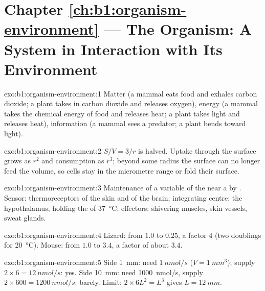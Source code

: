 \section*{Chapter \ref{ch:b1:organism-environment} --- The Organism: A System in Interaction with Its Environment}

\begin{solution}{exo:b1:organism-environment:1}
Matter (a mammal eats food and exhales carbon dioxide; a plant takes in
carbon dioxide and releases oxygen), energy (a mammal takes the chemical
energy of food and releases heat; a plant takes light and releases heat),
information (a mammal sees a predator; a plant bends toward light).
\end{solution}

\begin{solution}{exo:b1:organism-environment:2}
$S/V = 3/r$ is halved. Uptake through the surface grows as $r^2$ and
consumption as $r^3$; beyond some radius the surface can no longer feed
the volume, so cells stay in the micrometre range or fold their surface.
\end{solution}

\begin{solution}{exo:b1:organism-environment:3}
Maintenance of a variable of the  near a 
by . Sensor: thermoreceptors of the skin and of the
brain; integrating centre: the hypothalamus, holding the  of
\qty{37}{\celsius}; effectors: shivering muscles, skin vessels, sweat
glands.
\end{solution}

\begin{solution}{exo:b1:organism-environment:4}
Lizard: from $1.0$ to $0.25$, a factor $4$ (two doublings for
\qty{20}{\celsius}). Mouse: from $1.0$ to $3.4$, a factor of about
$3.4$.
\end{solution}

\begin{solution}{exo:b1:organism-environment:5}
Side \qty{1}{mm}: need $\qty{1}{nmol/s}$ ($V = \qty{1}{mm^3}$); supply
$2\times 6 = \qty{12}{nmol/s}$: yes. Side \qty{10}{mm}: need
\qty{1000}{nmol/s}, supply $2\times 600 = \qty{1200}{nmol/s}$: barely.
Limit: $2\times 6L^2 = L^3$ gives $L = \qty{12}{mm}$.
\end{solution}

